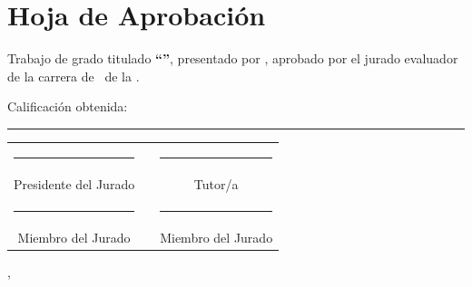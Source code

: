 \chapter*{Hoja de Aprobación}

\noindent Trabajo de grado titulado \textbf{``\tituloTesis''}, presentado por
\autorTesis, aprobado por el jurado evaluador de la carrera de \carreraTesis\
de la \universidadTesis.

\vspace{2cm}

\noindent Calificación obtenida: \rule{4cm}{0.4pt}

\vspace{3cm}

\begin{center}
\begin{tabular}{ccc}
\rule{5cm}{0.4pt} & \hspace{1cm} & \rule{5cm}{0.4pt} \\[0.2cm]
Presidente del Jurado & & Tutor/a \\[2cm]
\rule{5cm}{0.4pt} & & \rule{5cm}{0.4pt} \\[0.2cm]
Miembro del Jurado & & Miembro del Jurado \\
\end{tabular}
\end{center}

\vspace{2cm}

\begin{center}
\ciudadTesis, \anioTesis
\end{center}

